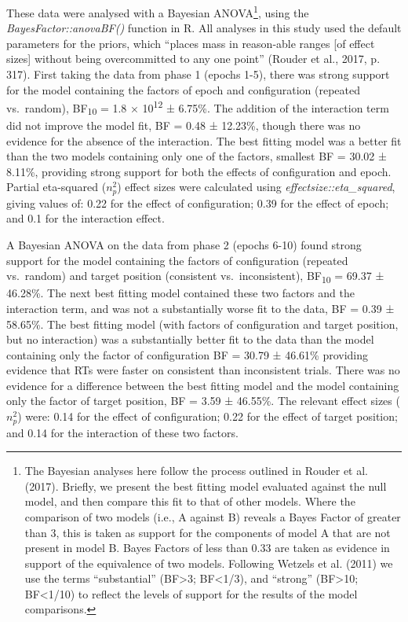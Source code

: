 \documentclass[
  man,
  floatsintext,
  longtable,
  nolmodern,
  notxfonts,
  notimes,
  colorlinks=true,linkcolor=blue,citecolor=blue,urlcolor=blue]{apa7}
\begin{document}
These data were analysed with a Bayesian ANOVA\footnote{The Bayesian
  analyses here follow the process outlined in Rouder et al. (2017).
  Briefly, we present the best fitting model evaluated against the null
  model, and then compare this fit to that of other models. Where the
  comparison of two models (i.e., A against B) reveals a Bayes Factor of
  greater than 3, this is taken as support for the components of model A
  that are not present in model B. Bayes Factors of less than 0.33 are
  taken as evidence in support of the equivalence of two models.
  Following Wetzels et al. (2011) we use the terms ``substantial''
  (BF\textgreater3; BF\textless1/3), and ``strong'' (BF\textgreater10;
  BF\textless1/10) to reflect the levels of support for the results of
  the model comparisons.}, using the \emph{BayesFactor::anovaBF()}
function in R. All analyses in this study used the default parameters
for the priors, which ``places mass in reason-able ranges {[}of effect
sizes{]} without being overcommitted to any one point'' (Rouder et al.,
2017, p. 317). First taking the data from phase 1 (epochs 1-5), there
was strong support for the model containing the factors of epoch and
configuration (repeated vs.~random), BF\textsubscript{10} = 1.8 ×
10\textsuperscript{12} ± 6.75\%. The addition of the interaction term
did not improve the model fit, BF = 0.48 ± 12.23\%, though there was no
evidence for the absence of the interaction. The best fitting model was
a better fit than the two models containing only one of the factors,
smallest BF = 30.02 ± 8.11\%, providing strong support for both the
effects of configuration and epoch. Partial eta-squared (\(n^2_p\))
effect sizes were calculated using \emph{effectsize::eta\_squared},
giving values of: 0.22 for the effect of configuration; 0.39 for the
effect of epoch; and 0.1 for the interaction effect.

A Bayesian ANOVA on the data from phase 2 (epochs 6-10) found strong
support for the model containing the factors of configuration (repeated
vs.~random) and target position (consistent vs.~inconsistent),
BF\textsubscript{10} = 69.37 ± 46.28\%. The next best fitting model
contained these two factors and the interaction term, and was not a
substantially worse fit to the data, BF = 0.39 ± 58.65\%. The best
fitting model (with factors of configuration and target position, but no
interaction) was a substantially better fit to the data than the model
containing only the factor of configuration BF = 30.79 ± 46.61\%
providing evidence that RTs were faster on consistent than inconsistent
trials. There was no evidence for a difference between the best fitting
model and the model containing only the factor of target position, BF =
3.59 ± 46.55\%. The relevant effect sizes (\(n^2_p\)) were: 0.14 for the
effect of configuration; 0.22 for the effect of target position; and
0.14 for the interaction of these two factors.
\end{document}
